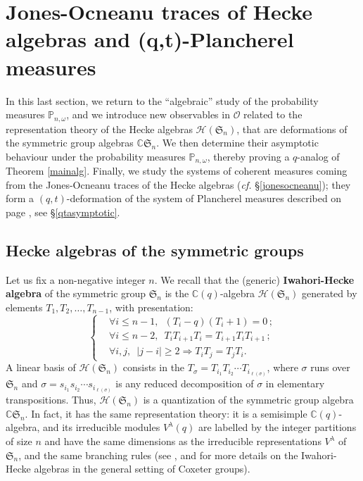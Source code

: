 \documentclass[smallextended,nospthms]{svjour3}
\theoremstyle{remark}
\newcommand{\C}{\mathbb{C}}
\newcommand{\hecke}{\mathscr{H}}
\newcommand{\sym}{\mathfrak{S}}
\newcommand{\proba}{\mathbb{P}}
\newcommand{\obs}{\mathscr{O}}
\begin{document}
\section{Jones-Ocneanu traces of Hecke algebras and (q,t)-Plancherel measures}\label{qtplancherel} 
In this last section, we return to the ``algebraic'' study of the probability measures $\proba_{n,\omega}$, and we introduce new observables in $\obs$ related to the representation theory of the Hecke algebras $\hecke(\sym_{n})$, that are deformations of the symmetric group algebras $\C\sym_{n}$. We then determine their asymptotic behaviour under the probability measures $\proba_{n,\omega}$, thereby proving a $q$-analog of Theorem \ref{mainalg}. Finally, we study the systems of coherent measures coming from the Jones-Ocneanu traces of the Hecke algebras (\emph{cf.} \S\ref{jonesocneanu}); they form a $(q,t)$-deformation of the system of Plancherel measures described on page \pageref{csspezialschur}, see \S\ref{qtasymptotic}.


\subsection{Hecke algebras of the symmetric groups} Let us fix a non-negative integer $n$. We recall that the (generic) \textbf{Iwahori-Hecke algebra} of the symmetric group $\sym_{n}$ is the $\C(q)$-algebra $\hecke(\sym_{n})$ generated by elements $T_{1},T_{2},\ldots,T_{n-1}$, with presentation:
$$
\begin{cases}
&\forall i \leq n-1,\,\,\,(T_{i}-q)(T_{i}+1)=0\,;\\
&\forall i \leq n-2,\,\,\,T_{i}T_{i+1}T_{i}=T_{i+1}T_{i}T_{i+1}\,;\\
&\forall i,j,\,\,\,|j-i| \geq 2 \Rightarrow T_{i}T_{j}=T_{j}T_{i}.
\end{cases}
$$
A linear basis of $\hecke(\sym_{n})$ consists in the $T_{\sigma}=T_{i_{1}}T_{i_{2}}\cdots T_{i_{\ell(\sigma)}}$, where $\sigma$ runs over $\sym_{n}$ and $\sigma=s_{i_{1}}s_{i_{2}}\cdots s_{i_{\ell(\sigma)}}$ is any reduced decomposition of $\sigma$ in elementary transpositions. Thus, $\hecke(\sym_{n})$ is a quantization of the symmetric group algebra $\C\sym_{n}$. In fact, it has the same representation theory: it is a semisimple $\C(q)$-algebra, and its irreducible modules $V^{\lambda}(q)$ are labelled by the integer partitions of size $n$ and have the same dimensions as the irreducible representations $V^{\lambda}$ of $\sym_{n}$, and the same branching rules (see \cite{Mat99}, and \cite{GP00} for more details on the Iwahori-Hecke algebras in the general setting of Coxeter groups).\bigskip\bigskip
\end{document}
